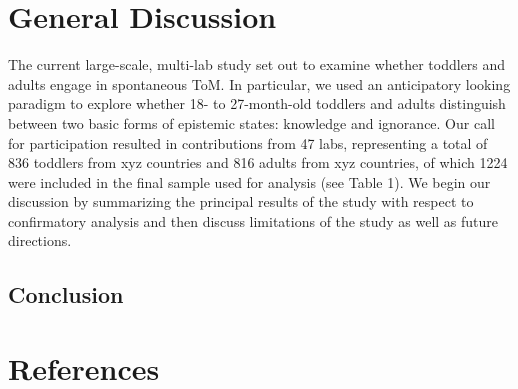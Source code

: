 \documentclass[
  english,
  man,floatsintext]{apa6}
\begin{document}
\hypertarget{general-discussion}{%
\section{General Discussion}\label{general-discussion}}

The current large-scale, multi-lab study set out to examine whether toddlers and adults engage in spontaneous ToM. In particular, we used an anticipatory looking paradigm to explore whether 18- to 27-month-old toddlers and adults distinguish between two basic forms of epistemic states: knowledge and ignorance. Our call for participation resulted in contributions from 47 labs, representing a total of 836 toddlers from xyz countries and 816 adults from xyz countries, of which 1224 were included in the final sample used for analysis (see Table 1). We begin our discussion by summarizing the principal results of the study with respect to confirmatory analysis and then discuss limitations of the study as well as future directions.

\hypertarget{conclusion}{%
\subsection{Conclusion}\label{conclusion}}

\newpage

\hypertarget{references}{%
\section{References}\label{references}}

\begingroup
\setlength{\parindent}{-0.5in}
\setlength{\leftskip}{0.5in}
\end{document}

